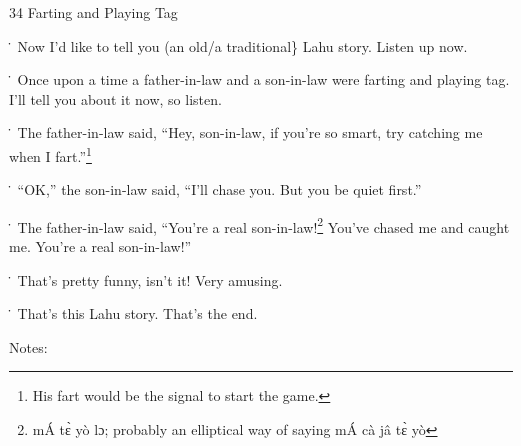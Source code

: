 
34 Farting and Playing Tag

\. Now I'd like to tell you (an old/a traditional\} Lahu story.  Listen up now.

\. Once upon a time a father-in-law and a son-in-law were farting and playing tag.
I'll tell you about it now, so listen.

\. The father-in-law said, ``Hey, son-in-law, if you're so smart, try catching
me when I fart.''\footnote{His fart would be the signal to start the game.}

\. ``OK,'' the son-in-law said, ``I'll chase you.  But you be quiet first.''

\. The father-in-law said, ``You're a real son-in-law!\footnote{mÁ tɛ̀ yò lɔ; probably an elliptical way of saying mÁ cà jâ tɛ̀ yò} You've chased me and
caught me.  You're a real son-in-law!''

\. That's pretty funny, isn't it!  Very amusing.

\. That's this Lahu story.  That's the end.

Notes:

